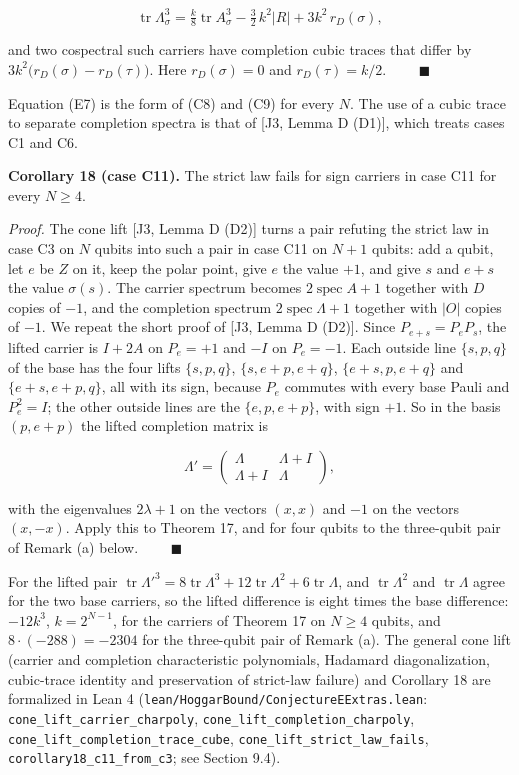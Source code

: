 \documentclass[11pt,a4paper]{article}
\begin{document}
\[\operatorname{tr}\Lambda_\sigma^3=\tfrac k8\operatorname{tr}A_\sigma^3-\tfrac32\,k^2|R|+3k^2\,r_D(\sigma),
\tag{E7}\]

and two cospectral such carriers have completion cubic traces that differ by
\(3k^2\bigl(r_D(\sigma)-r_D(\tau)\bigr)\). Here \(r_D(\sigma)=0\) and \(r_D(\tau)=k/2\). \(\qquad\blacksquare\)

Equation (E7) is the form of (C8) and (C9) for every \(N\). The use of a cubic trace to separate
completion spectra is that of {[}J3, Lemma D (D1){]}, which treats cases C1 and C6.

\textbf{Corollary 18 (case C11).} The strict law fails for sign carriers in case C11 for every \(N\ge4\).

\emph{Proof.} The cone lift {[}J3, Lemma D (D2){]} turns a pair refuting the strict law in case C3 on \(N\)
qubits into such a pair in case C11 on \(N+1\) qubits: add a qubit, let \(e\) be \(Z\) on it, keep the polar
point, give \(e\) the value \(+1\), and give \(s\) and \(e+s\) the value \(\sigma(s)\). The carrier spectrum becomes
\(2\operatorname{spec}A+1\) together with \(D\) copies of \(-1\), and the completion spectrum
\(2\operatorname{spec}\Lambda+1\) together with \(|O|\) copies of \(-1\). We repeat the short proof of
{[}J3, Lemma D (D2){]}. Since \(P_{e+s}=P_eP_s\), the lifted carrier is \(I+2A\) on \(P_e=+1\) and \(-I\) on
\(P_e=-1\). Each outside line \(\{s,p,q\}\) of the base has the four lifts \(\{s,p,q\}\), \(\{s,e+p,e+q\}\),
\(\{e+s,p,e+q\}\) and \(\{e+s,e+p,q\}\), all with its sign, because \(P_e\) commutes with every base Pauli and
\(P_e^2=I\); the other outside lines are the \(\{e,p,e+p\}\), with sign \(+1\). So in the basis \((p,e+p)\) the
lifted completion matrix is

\[\Lambda'=\begin{pmatrix}\Lambda&\Lambda+I\\\Lambda+I&\Lambda\end{pmatrix},\]

with the eigenvalues \(2\lambda+1\) on the vectors \((x,x)\) and \(-1\) on the vectors \((x,-x)\). Apply this to
Theorem 17, and for four qubits to the three-qubit pair of Remark (a) below. \(\qquad\blacksquare\)

For the lifted pair
\(\operatorname{tr}\Lambda'^3=8\operatorname{tr}\Lambda^3+12\operatorname{tr}\Lambda^2+6\operatorname{tr}\Lambda\), and
\(\operatorname{tr}\Lambda^2\) and \(\operatorname{tr}\Lambda\) agree for the two base carriers, so the lifted difference is
eight times the base difference: \(-12k^3\), \(k=2^{N-1}\), for the carriers of Theorem 17 on \(N\ge4\) qubits,
and \(8\cdot(-288)=-2304\) for the three-qubit pair of Remark (a). The general cone lift (carrier and
completion characteristic polynomials, Hadamard diagonalization, cubic-trace identity and preservation of
strict-law failure) and Corollary 18 are formalized in Lean 4 (\nolinkurl{lean/HoggarBound/ConjectureEExtras.lean}:
\nolinkurl{cone_lift_carrier_charpoly}, \nolinkurl{cone_lift_completion_charpoly}, \nolinkurl{cone_lift_completion_trace_cube},
\nolinkurl{cone_lift_strict_law_fails}, \nolinkurl{corollary18_c11_from_c3}; see Section 9.4).
\end{document}
